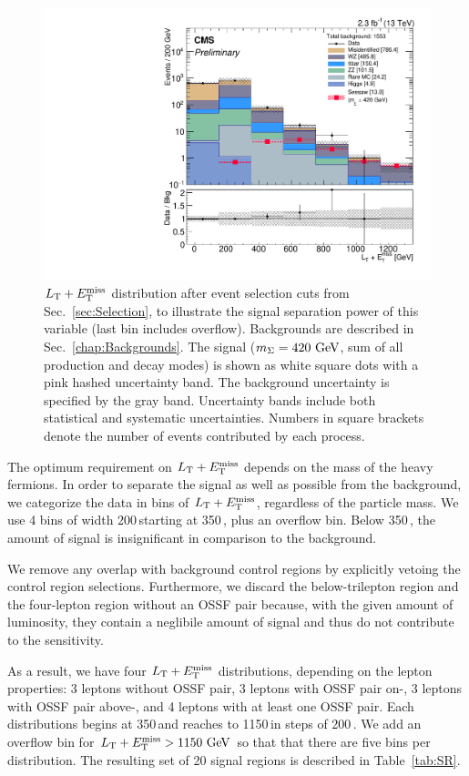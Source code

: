 \begin{figure}
\begin{center}
	\includegraphics[width=.7\textwidth]{Strategy/LT+MET}
	\caption{$L_\textrm{T} + E_{\mathrm{T}}^{\text{miss}}$ distribution after event selection cuts from Sec.~\ref{sec:Selection}, to illustrate the signal separation power of this variable (last bin includes overflow). Backgrounds are described in Sec.~{\ref{chap:Backgrounds}}. The signal ($m_\Sigma = 420\,\,\text{Ge\hspace{-.08em}V}$, sum of all production and decay modes) is shown as white square dots with a pink hashed uncertainty band. The background uncertainty is specified by the gray band. Uncertainty bands include both statistical and systematic uncertainties. Numbers in square brackets denote the number of events contributed by each process.
	\label{fig:Optimization}}
\end{center}
\end{figure}

The optimum requirement on $L_\textrm{T} + E_{\mathrm{T}}^{\text{miss}}$ depends on the mass of the heavy fermions. In order to separate the signal as well as possible from the background, we categorize the data in bins of $L_\textrm{T} + E_{\mathrm{T}}^{\text{miss}}$, regardless of the particle mass. We use 4 bins of width 200\,\GeV starting at 350\,\GeV, plus an overflow bin. Below 350\,\GeV, the amount of signal is insignificant in comparison to the background.

We remove any overlap with background control regions by explicitly vetoing the control region selections. Furthermore, we discard the below-\Z trilepton region and the four-lepton region without an OSSF pair because, with the given amount of luminosity, they contain a neglibile amount of signal and thus do not contribute to the sensitivity.

As a result, we have four $L_\textrm{T} + E_{\mathrm{T}}^{\text{miss}}$ distributions, depending on the lepton properties: 3 leptons without OSSF pair, 3 leptons with OSSF pair on-\Z, 3 leptons with OSSF pair above-\Z, and 4 leptons with at least one OSSF pair. Each distributions begins at 350\,\GeV and reaches to 1150\,\GeV in steps of 200\,\GeV. We add an overflow bin for $L_\textrm{T} + E_{\mathrm{T}}^{\text{miss}} > 1150\,\,\text{Ge\hspace{-.08em}V}$ so that that there are five bins per distribution. The resulting set of 20 signal regions is described in Table~\ref{tab:SR}.

